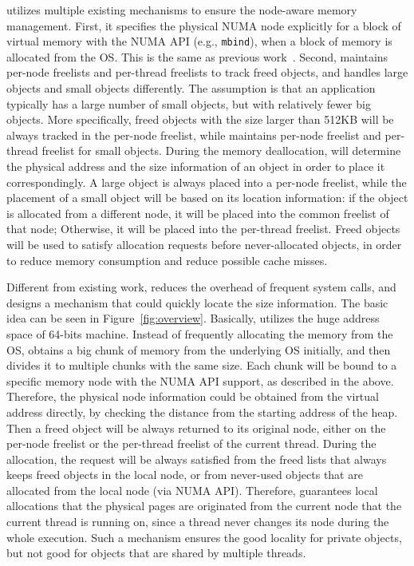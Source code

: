 \NA{} utilizes multiple existing mechanisms to ensure the node-aware memory management. First, it specifies the physical NUMA node explicitly for a block of virtual memory with the NUMA API (e.g., \texttt{mbind}), when a block of memory is allocated from the OS. This is the same  as  previous work~\cite{tcmallocnew}. Second, \NA{} maintains per-node freelists and per-thread freelists to track freed objects, and handles large objects and small objects differently. The assumption is that an application typically has a large number of small objects, but with relatively fewer big objects.  More specifically, freed objects with the size larger than 512KB will be always tracked in the per-node freelist, while \NA{} maintains per-node freelist and per-thread freelist for small objects.  During the memory deallocation, \NA{} will determine the physical address and the size information of an object in order to place it correspondingly. A large object is always placed into a per-node freelist, while the placement of a small object will be based on its location information: if the object is allocated from a different node, it will be placed into the common freelist of that node; Otherwise, it will be placed into the per-thread freelist. Freed objects will be used to satisfy  allocation requests before never-allocated objects, in order to reduce  memory consumption and reduce possible cache misses.  

Different from existing work, \NA{} reduces the overhead of frequent system calls, and designs a mechanism that could quickly locate the size information. The basic idea can be seen in Figure~\ref{fig:overview}. Basically, \NA{} utilizes the huge address space of 64-bits machine. Instead of frequently allocating the memory from the OS, \NA{} obtains a big chunk of memory from the underlying OS initially, and then divides it to multiple chunks with the same size. Each chunk will be bound to a specific memory node with the NUMA API support, as described in the above. Therefore, the physical node information could be obtained from the virtual address directly, by checking the distance from the starting address of the heap. Then a freed object will be always returned to its original node, either on the per-node freelist or the per-thread freelist of the current thread. During the allocation, the request will be always satisfied from the freed lists that always keeps freed objects in the local node, or from never-used objects that are allocated from the local node (via NUMA API). Therefore, \NA{} guarantees local allocations that the physical pages are originated from the current node that the current thread is running on, since a thread never changes its node during the whole execution. Such a mechanism ensures the good locality for private objects, but not good for objects that are shared by multiple threads. 

